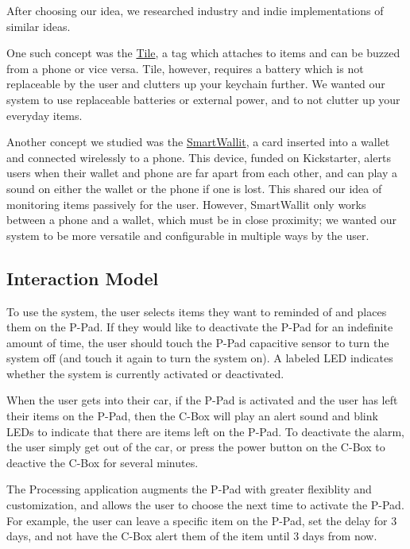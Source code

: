 \documentclass[10pt, oneside, letterpaper, titlepage]{article}
\begin{document}
			After choosing our idea, we researched industry and indie implementations of similar ideas.

			One such concept was the \href{https://www.thetileapp.com/}{Tile}, a tag which attaches to items and can be buzzed from a phone or vice versa. Tile, however, requires a battery which is not replaceable by the user and clutters up your keychain further. We wanted our system to use replaceable batteries or external power, and to not clutter up your everyday items.

			Another concept we studied was the \href{https://www.kickstarter.com/projects/416260479/smartwallit-pro-new-smartwallit-new-experience/description}{SmartWallit}, a card inserted into a wallet and connected wirelessly to a phone. This device, funded on Kickstarter, alerts users when their wallet and phone are far apart from each other, and can play a sound on either the wallet or the phone if one is lost. This shared our idea of monitoring items passively for the user. However, SmartWallit only works between a phone and a wallet, which must be in close proximity; we wanted our system to be more versatile and configurable in multiple ways by the user.

		\subsection{Interaction Model}

			To use the system, the user selects items they want to reminded of and places them on the P-Pad. If they would like to deactivate the P-Pad for an indefinite amount of time, the user should touch the P-Pad capacitive sensor to turn the system off (and touch it again to turn the system on). A labeled LED indicates whether the system is currently activated or deactivated.

			When the user gets into their car, if the P-Pad is activated and the user has left their items on the P-Pad, then the C-Box will play an alert sound and blink LEDs to indicate that there are items left on the P-Pad. To deactivate the alarm, the user simply get out of the car, or press the power button on the C-Box to deactive the C-Box for several minutes.

			The Processing application augments the P-Pad with greater flexiblity and customization, and allows the user to choose the next time to activate the P-Pad. For example, the user can leave a specific item on the P-Pad, set the delay for 3 days, and not have the C-Box alert them of the item until 3 days from now.
\end{document}
